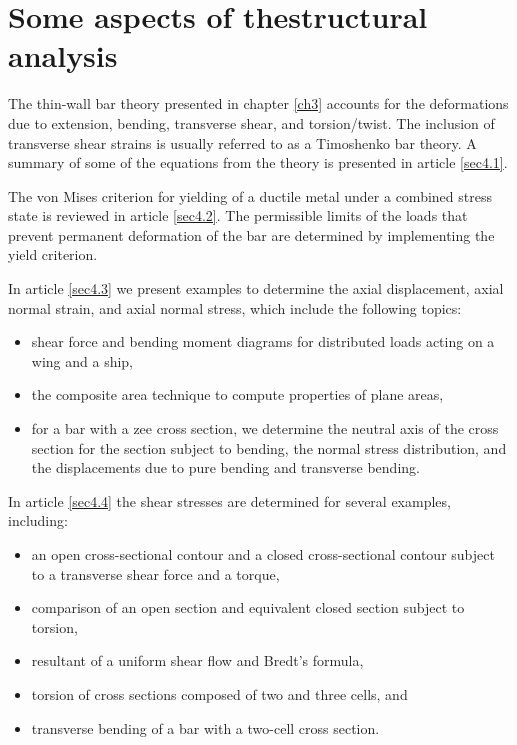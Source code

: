 \documentclass{AeroStructure-ERJohnson}
\begin{document}
\mainmatter


\setcounter{page}{71}
\setcounter{chapter}{3}

\chapter[Some aspects of the structural analysis]{Some aspects of the\break structural analysis} \label{ch4}

The thin-wall bar theory presented in chapter \ref{ch3} accounts for the deformations due to extension, bending, transverse shear, and torsion/twist. The inclusion of transverse shear strains is usually referred to as a Timoshenko bar theory. A summary of some of the equations from the theory is presented in article \ref{sec4.1}.

The von Mises criterion for yielding of a ductile metal under a combined stress state is reviewed in article \ref{sec4.2}. The permissible limits of the loads that prevent permanent deformation of the bar are determined by implementing the yield criterion.

In article \ref{sec4.3} we present examples to determine the axial displacement, axial normal strain, and axial normal stress, which include the following topics:
\begin{itemize}
 \item shear force and bending moment diagrams for distributed loads acting on a wing and a ship,
  \item the composite area technique to compute properties of plane areas,
  \item for a bar with a zee cross section, we determine the neutral axis of the cross section for the section subject to bending, the normal stress distribution, and the displacements due to pure bending and transverse bending.
\end{itemize}

In article \ref{sec4.4} the shear stresses are determined for several examples, including:
\begin{itemize}
  \item an open cross-sectional contour and a closed cross-sectional contour subject to a transverse shear force and a torque,
  \item comparison of an open section and equivalent closed section subject to torsion,
  \item resultant of a uniform shear flow and Bredt's formula,
  \item torsion of cross sections composed of two and three cells, and
  \item transverse bending of a bar with a two-cell cross section.
\end{itemize}
\end{document}
